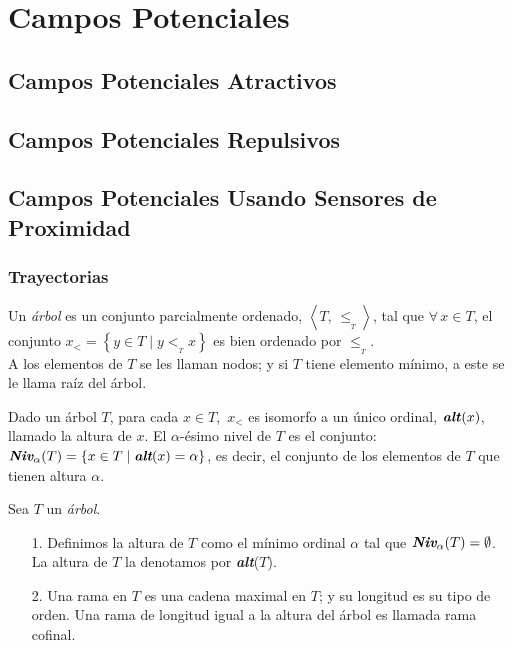 \chapter{Campos Potenciales}
\section{Campos Potenciales Atractivos}
\section{Campos Potenciales Repulsivos}
\section{Campos Potenciales Usando Sensores de Proximidad}
\subsection{Trayectorias}
\begin{definicion}

	Un \textit{árbol} es un conjunto parcialmente ordenado, $\left\langle T,\, \leq_{_T} \right\rangle$, tal que $\forall \, x\in T$, el conjunto $x_{\scriptscriptstyle <} = \left\lbrace y\in T \mid y <_{_T} x \right\rbrace$ es bien ordenado por $\leq_{_T}$. \\
	
	A los elementos de $T$ se les llaman nodos; y si $T$ tiene elemento mínimo, a este se le llama raíz del árbol.  
\end{definicion}

Dado un árbol $T$, para cada $x\in T$, $\, x_{\scriptscriptstyle <}$ es isomorfo a un único ordinal, $\textbf{\textit{alt}}(x)$, llamado la altura de $x$. El $\alpha$-ésimo nivel de $T$ es el conjunto: $\textit{\textbf{Niv}}_{\alpha}(T) = \left\lbrace x\in T \mid \textit{\textbf{alt}}(x) = \alpha \right\rbrace$, es decir, el conjunto de los elementos de $T$ que tienen altura $\alpha$.

\begin{definicion}
	Sea $T$ un \textit{árbol}. 
	\begin{itemize}
		\item[1.] Definimos la altura de $T$ como el mínimo ordinal $\alpha$ tal que $\textit{\textbf{Niv}}_{\alpha}(T) = \emptyset$. La altura de $T$ la denotamos por \textit{\textbf{alt}}($T$).
		
		\item[2.] Una rama en $T$ es una cadena maximal en $T$; y su longitud es su tipo de orden. Una rama de longitud igual a la altura del árbol es llamada rama cofinal.	
	\end{itemize}
\end{definicion}

